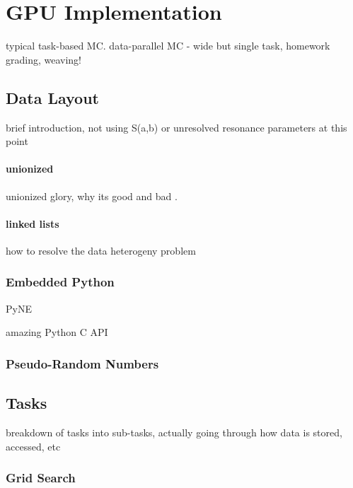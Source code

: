 \chapter{GPU Implementation}

typical task-based MC.  data-parallel MC - wide but single task, homework grading, weaving!


\section{Data Layout}

brief introduction, not using S(a,b) or unresolved resonance parameters at this point

\subsubsection{unionized}

unionized glory, why its good and bad \cite{jaakko}.

\subsubsection{linked lists}

how to resolve the data heterogeny problem

\subsection{Embedded Python}

PyNE

amazing Python C API

\subsection{Pseudo-Random Numbers}



\section{Tasks}

breakdown of tasks into sub-tasks, actually going through how data is stored, accessed, etc

\subsection{Grid Search}

